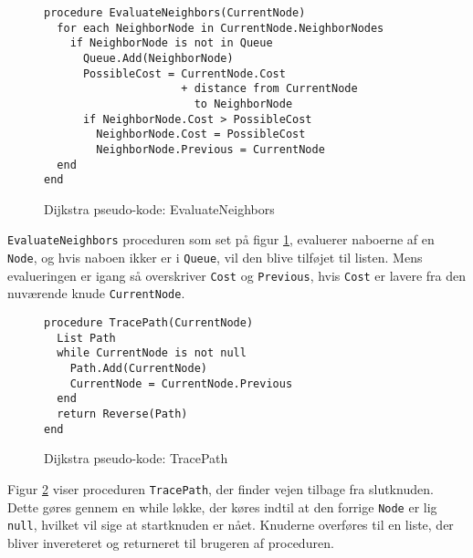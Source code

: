 \begin{figure}[H]
\begin{lstlisting}
procedure EvaluateNeighbors(CurrentNode)
  for each NeighborNode in CurrentNode.NeighborNodes
    if NeighborNode is not in Queue
      Queue.Add(NeighborNode)
      PossibleCost = CurrentNode.Cost 
                     + distance from CurrentNode
                       to NeighborNode
      if NeighborNode.Cost > PossibleCost
        NeighborNode.Cost = PossibleCost
        NeighborNode.Previous = CurrentNode
  end
end
\end{lstlisting}
\caption{Dijkstra pseudo-kode: EvaluateNeighbors}\label{DijkstraCodeEvaluateNeighbors}
\end{figure}

\texttt{EvaluateNeighbors} proceduren som set på figur \ref{DijkstraCodeEvaluateNeighbors}, evaluerer naboerne af en \texttt{Node}, og hvis naboen ikker er i \texttt{Queue}, vil den blive tilføjet til listen. Mens evalueringen er igang så overskriver \texttt{Cost} og \texttt{Previous}, hvis \texttt{Cost} er lavere fra den nuværende knude \texttt{CurrentNode}. 

\begin{figure}[H]
\begin{lstlisting}
procedure TracePath(CurrentNode)
  List Path
  while CurrentNode is not null
    Path.Add(CurrentNode)
    CurrentNode = CurrentNode.Previous
  end
  return Reverse(Path)
end
\end{lstlisting}
\caption{Dijkstra pseudo-kode: TracePath}\label{DijkstraCodeTracePath}
\end{figure}

Figur \ref{DijkstraCodeTracePath} viser proceduren \texttt{TracePath}, der finder vejen tilbage fra slutknuden. Dette gøres gennem en while løkke, der køres indtil at den forrige \texttt{Node} er lig \texttt{null}, hvilket vil sige at startknuden er nået. Knuderne overføres til en liste, der bliver invereteret og returneret til brugeren af proceduren.